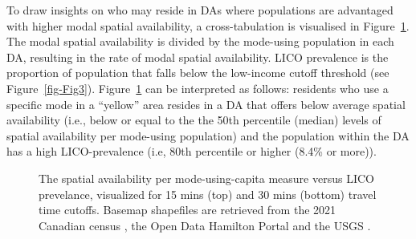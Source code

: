 \documentclass[
  authoryear,
  preprint,
  3p]{elsarticle}
\begin{document}
To draw insights on who may reside in DAs where populations are
advantaged with higher modal spatial availability, a cross-tabulation is
visualised in Figure~\ref{fig-Fig6}. The modal spatial availability is
divided by the mode-using population in each DA, resulting in the rate
of modal spatial availability. LICO prevalence is the proportion of
population that falls below the low-income cutoff threshold (see
Figure~\ref{fig-Fig3}). Figure~\ref{fig-Fig6} can be interpreted as
follows: residents who use a specific mode in a ``yellow'' area resides
in a DA that offers below average spatial availability (i.e., below or
equal to the the 50th percentile (median) levels of spatial availability
per mode-using population) and the population within the DA has a high
LICO-prevalence (i.e, 80th percentile or higher (8.4\% or more)).

\begin{figure}


\caption{\label{fig-Fig6}The spatial availability per mode-using-capita
measure versus LICO prevelance, visualized for 15 mins (top) and 30 mins
(bottom) travel time cutoffs. Basemap shapefiles are retrieved from the
2021 Canadian census \citep{governmentofcanadaCensusPopulation2023}, the
Open Data Hamilton Portal \citep{opendatahamiltonCityBoundary2023} and
the USGS \citep{greatlakesUSGS2010}.}

\end{figure}%
\end{document}
